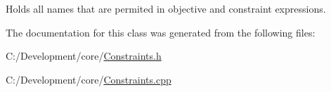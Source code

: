 Holds all names that are permited in objective and constraint expressions. 



The documentation for this class was generated from the following files\-:\begin{DoxyCompactItemize}
\item 
C\-:/\-Development/core/\hyperlink{_constraints_8h}{Constraints.\-h}\item 
C\-:/\-Development/core/\hyperlink{_constraints_8cpp}{Constraints.\-cpp}\end{DoxyCompactItemize}

